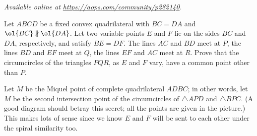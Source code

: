 \textsl{Available online at \url{https://aops.com/community/p282140}.}
\begin{mdframed}[style=mdpurplebox,frametitle={Problem statement}]
Let $ABCD$ be a fixed convex quadrilateral
with $BC=DA$ and $\ol{BC} \nparallel \ol{DA}$.
Let two variable points $E$ and $F$ lie on the
sides $BC$ and $DA$, respectively, and satisfy $BE=DF$.
The lines $AC$ and $BD$ meet at $P$,
the lines $BD$ and $EF$ meet at $Q$,
the lines $EF$ and $AC$ meet at $R$.
Prove that the circumcircles of the triangles $PQR$,
as $E$ and $F$ vary, have a common point other than $P$.
\end{mdframed}
Let $M$ be the Miquel point of complete quadrilateral $ADBC$;
in other words, let $M$ be the second intersection point
of the circumcircles of $\triangle APD$ and $\triangle BPC$.
(A good diagram should betray this secret;
all the points are given in the picture.)
This makes lots of sense since we know $E$ and $F$
will be sent to each other under the spiral similarity too.

